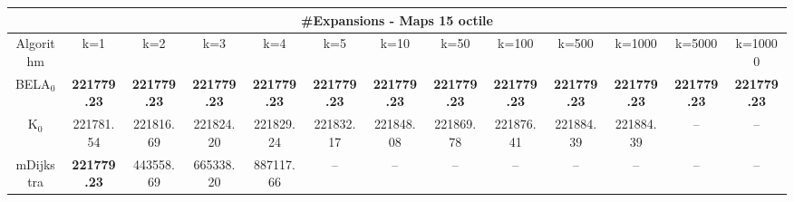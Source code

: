 \begin{tabular}{c|cccccccccccc}\toprule
\multicolumn{13}{c}{#Expansions - Maps 15 octile}\\ \midrule
Algorithm & k=1 & k=2 & k=3 & k=4 & k=5 & k=10 & k=50 & k=100 & k=500 & k=1000 & k=5000 & k=10000 \\ \midrule
BELA$_0$ & \textbf{221779.23} & \textbf{221779.23} & \textbf{221779.23} & \textbf{221779.23} & \textbf{221779.23} & \textbf{221779.23} & \textbf{221779.23} & \textbf{221779.23} & \textbf{221779.23} & \textbf{221779.23} & \textbf{221779.23} & \textbf{221779.23} \\
K$_0$ & 221781.54 & 221816.69 & 221824.20 & 221829.24 & 221832.17 & 221848.08 & 221869.78 & 221876.41 & 221884.39 & 221884.39 & -- & -- \\
mDijkstra & \textbf{221779.23} & 443558.69 & 665338.20 & 887117.66 & -- & -- & -- & -- & -- & -- & -- & -- \\ \bottomrule 
\end{tabular}

